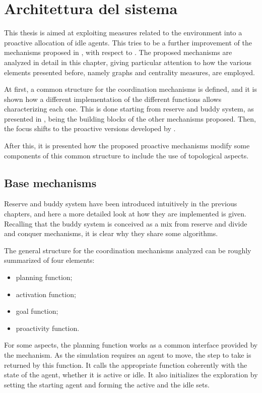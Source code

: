 \chapter{Architettura del sistema}
\label{capitolo5}
\thispagestyle{empty}

This thesis is aimed at exploiting measures related to the environment
into a proactive allocation of idle agents. This tries to be a further
improvement of the mechanisms proposed in \cite{Rogers2013}, with
respect to \cite{Cattaneo2017}. The proposed mechanisms are analyzed in
detail in this chapter, giving particular attention to how the various
elements presented before, namely graphs and centrality measures,
are employed. 

At first, a common structure for the coordination mechanisms is defined,
and it is shown how a different implementation of the different functions
allows characterizing each one. This is done starting from reserve
and buddy system, as presented in \cite{Rogers2013}, being the building
blocks of the other mechanisms proposed. Then, the focus shifts to
the proactive versions developed by \cite{Cattaneo2017}.

After this, it is presented how the proposed proactive mechanisms
modify some components of this common structure to include the use
of topological aspects. 

\section{Base mechanisms}

Reserve and buddy system have been introduced intuitively in the previous
chapters, and here a more detailed look at how they are implemented
is given. Recalling that the buddy system is conceived as a mix from
reserve and divide and conquer mechanisms, it is clear why they share
some algorithms. 

The general structure for the coordination mechanisms analyzed can
be roughly summarized of four elements:
\begin{itemize}
\item planning function;
\item activation function;
\item goal function;
\item proactivity function.
\end{itemize}
For some aspects, the planning function works as a common interface
provided by the mechanism. As the simulation requires an agent to
move, the step to take is returned by this function. It calls the
appropriate function coherently with the state of the agent, whether
it is active or idle. It also initializes the exploration by setting
the starting agent and forming the active and the idle sets.

